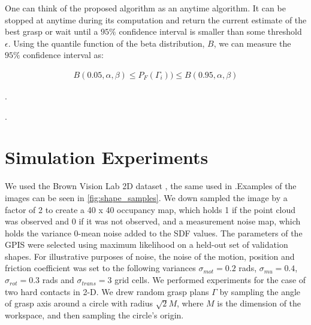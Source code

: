 \documentclass[a4paper, 10pt, conference]{ieeeconf}      %
\begin{document}
One can think of the proposed algorithm as an anytime algorithm. It can be stopped at anytime during its computation and return the current estimate of the best grasp or wait until a $95\%$ confidence interval is smaller than some threshold $\epsilon$. Using the quantile function of the beta distribution, $B$, we can measure the $95\%$ confidence interval as: 

\vspace{-2ex}
\begin{align}\label{eq:confidence}
B(0.05,\alpha,\beta) \leq P_F(\Gamma_i)) \leq B(0.95,\alpha,\beta)
\end{align}

\vspace{-2ex}
. 

 .
\section{Simulation Experiments}
We used the Brown Vision Lab 2D dataset \cite{brown}, the same used in \cite{christopoulos2007handling}.Examples of the images can be seen in \ref{fig:shape_samples}.  We down sampled the image by a factor of 2 to create a 40 x 40 occupancy map, which holds 1 if the point cloud was observed and 0 if it was not observed, and a measurement noise map, which holds the variance 0-mean noise added to the SDF values. The parameters of the GPIS were selected using maximum likelihood on a held-out set of validation shapes. For illustrative purposes of noise, the noise of the motion, position and friction coefficient was set to the following variances $\sigma_{mot} = 0.2$ rads, $\sigma_{mu} = 0.4$, $\sigma_{rot} = 0.3$ rads and $\sigma_{trans} = 3$ grid cells.
We performed experiments for the case of two hard contacts in 2-D. We drew random grasp plans $\Gamma$ by sampling the angle of grasp axis around a circle with radius $\sqrt{2} M$, where $M$ is the dimension of the workspace, and then sampling the circle's origin. 
\end{document}
